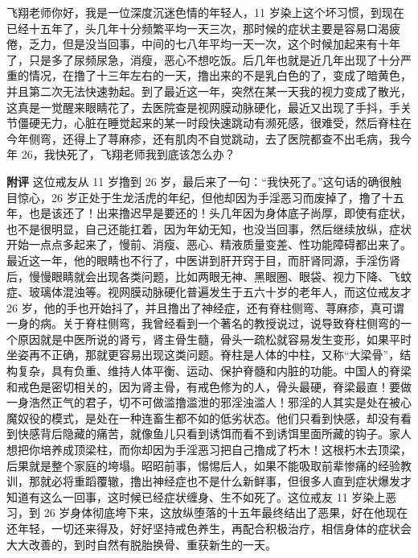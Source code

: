 \begin{case}
    飞翔老师你好，我是一位深度沉迷色情的年轻人，11 岁染上这个坏习惯，到现在已经十五年了，头几年十分频繁平均一天三次，那时候的症状主要是容易口渴疲倦，乏力，但是没当回事，中间的七八年平均一天一次，这个时候加起来有十年了，只是多了尿频尿急，消瘦，恶心不想吃饭。后几年也就是近几年出现了十分严重的情况，在撸了十三年左右的一天，撸出来的不是乳白色的了，变成了暗黄色，并且第二次无法快速勃起。到了最近这一年，突然在某一天我的视力变成了散光，这真是一觉醒来眼睛花了，去医院查是视网膜动脉硬化，最近又出现了手抖，手关节僵硬无力，心脏在睡觉起来的某一时段快速跳动有濒死感，很难受，然后脊柱在今年侧弯，还得上了荨麻疹，还有肌肉不自觉跳动，去了医院都查不出毛病，我今年 26，我快死了，飞翔老师我到底该怎么办？

    \textbf{附评} 这位戒友从 11 岁撸到 26 岁，最后来了一句：“我快死了。”这句话的确很触目惊心，26 岁正处于生龙活虎的年纪，但他却因为手淫恶习而废掉了，撸了十五年，也是该还了！出来撸迟早是要还的！头几年因为身体底子尚厚，即使有症状，也不是很明显，自己还能扛着，因为年幼无知，也没当回事，然后继续放纵，症状开始一点点多起来了，慢前、消瘦、恶心、精液质量变差、性功能障碍都出来了。最近这一年，他的眼睛也不行了，中医讲到肝开窍于目，而肝肾同源，手淫伤肾后，慢慢眼睛就会出现各类问题，比如两眼无神、黑眼圈、眼袋、视力下降、飞蚊症、玻璃体混浊等。视网膜动脉硬化普遍发生于五六十岁的老年人，而这位戒友才 26 岁，他的手也开始抖了，并且撸出了神经症，还有脊柱侧弯、荨麻疹，真可谓一身的病。关于脊柱侧弯，我曾经看到一个著名的教授说过，说导致脊柱侧弯的一个原因就是中医所说的肾亏，肾主骨生髓，骨头一疏松就容易发生变形，如果平时坐姿再不正确，那就更容易出现这类问题。脊柱是人体的中柱，又称“大梁骨”，结构复杂，具有负重、维持人体平衡、运动、保护脊髓和内脏的功能。中国人的脊梁和戒色是密切相关的，因为肾主骨，有戒色修为的人，骨头最硬，脊梁最直！要做一身浩然正气的君子，切不可做滥撸滥泄的邪淫浊滥人！邪淫的人其实是处在被心魔奴役的模式，是处在一种连畜生都不如的低劣状态。他们只看到快感，却没有看到快感背后隐藏的痛苦，就像鱼儿只看到诱饵而看不到诱饵里面所藏的钩子。家人想把你培养成顶梁柱，而你却因为手淫恶习把自己撸成了朽木！这根朽木去顶梁，后果就是整个家庭的垮塌。昭昭前事，惕惕后人，如果不能吸取前辈惨痛的经验教训，那就必将重蹈覆辙，撸出神经症也不是什么新鲜事，但很多人直到症状爆发才知道有这么一回事，这时候已经症状缠身、生不如死了。这位戒友 11 岁染上恶习，到 26 岁身体彻底垮下来，这放纵堕落的十五年最终结出了恶果，好在他现在还年轻，一切还来得及，好好坚持戒色养生，再配合积极治疗，相信身体的症状会大大改善的，到时自然有脱胎换骨、重获新生的一天。
\end{case}

